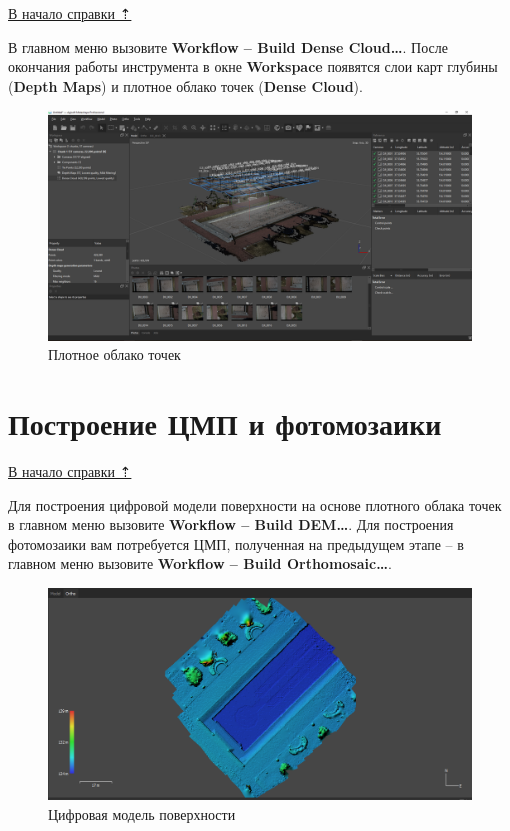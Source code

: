 \documentclass[
  12pt,
]{book}
\begin{document}
\protect\hyperlink{agisoft}{В начало справки ⇡}

В главном меню вызовите \textbf{Workflow -- Build Dense Cloud\ldots{}}. После окончания работы инструмента в окне \textbf{Workspace} появятся слои карт глубины (\textbf{Depth Maps}) и плотное облако точек (\textbf{Dense Cloud}).

\begin{figure}
\centering
\includegraphics{images/Ref18/Dense_Cloud.png}
\caption{Плотное облако точек}
\end{figure}

\hypertarget{agisoft-DEM}{%
\section{Построение ЦМП и фотомозаики}\label{agisoft-DEM}}

\protect\hyperlink{agisoft}{В начало справки ⇡}

Для построения цифровой модели поверхности на основе плотного облака точек в главном меню вызовите \textbf{Workflow -- Build DEM\ldots{}}. Для построения фотомозаики вам потребуется ЦМП, полученная на предыдущем этапе -- в главном меню вызовите \textbf{Workflow -- Build Orthomosaic\ldots{}}.

\begin{figure}
\centering
\includegraphics{images/Ref18/DEM.png}
\caption{Цифровая модель поверхности}
\end{figure}
\end{document}
